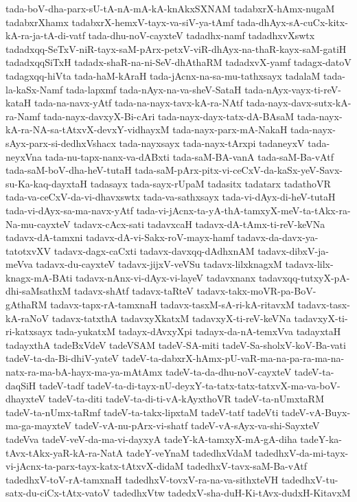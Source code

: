 {tada-boV-dha-parx-sU-tA-nA-mA-kA-knAkxSXNAM
tadabxrX-hAmx-nugaM
tadabxrXhamx
tadabxrX-hemxV-tayx-va-siV-ya-tAmf
tada-dhAyx-sA-cuCx-kitx-kA-ra-ja-tA-di-vatf
tada-dhu-noV-cayxteV
tadadhx-namf
tadadhxvXswtx
tadadxqq-SeTxV-niR-tayx-saM-pArx-petxV-viR-dhAyx-na-thaR-kayx-saM-gatiH
tadadxqqSiTxH
tadadx-shaR-na-ni-SeV-dhAthaRM
tadadxvX-yamf
tadagx-datoV
tadagxqq-hiVta
tada-haM-kAraH
tada-jAcnx-na-sa-mu-tathxsayx
tadalaM
tada-la-kaSx-Namf
tada-lapxmf
tada-nAyx-na-va-sheV-SataH
tada-nAyx-vayx-ti-reV-kataH
tada-na-navx-yAtf
tada-na-nayx-tavx-kA-ra-NAtf
tada-nayx-davx-sutx-kA-ra-Namf
tada-nayx-davxyX-Bi-cAri
tada-nayx-dayx-tatx-dA-BAsaM
tada-nayx-kA-ra-NA-sa-tAtxvX-devxY-vidhayxM
tada-nayx-parx-mA-NakaH
tada-nayx-sAyx-parx-si-dedhxVshacx
tada-nayxsayx
tada-nayx-tArxpi
tadaneyxV
tada-neyxVna
tada-nu-tapx-nanx-va-dABxti
tada-saM-BA-vanA
tada-saM-Ba-vAtf
tada-saM-boV-dha-heV-tutaH
tada-saM-pArx-pitx-vi-ceCxV-da-kaSx-yeV-Savx-su-Ka-kaq-dayxtaH
tadasayx
tada-sayx-rUpaM
tadasitx
tadatarx
tadathoVR
tada-va-ceCxV-da-vi-dhavxswtx
tada-va-sathxsayx
tada-vi-dAyx-di-heV-tutaH
tada-vi-dAyx-sa-ma-navx-yAtf
tada-vi-jAcnx-ta-yA-thA-tamxyX-meV-ta-tAkx-ra-Na-mu-cayxteV
tadavx-cAcx-sati
tadavxcaH
tadavx-dA-tAmx-ti-reV-keVNa
tadavx-dA-tamxni
tadavx-dA-vi-Sakx-roV-mayx-hamf
tadavx-da-davx-ya-tatotxvXV
tadavx-dagx-caCxti
tadavx-davxqq-dAdhxnAM
tadavx-dibxV-ja-meVva
tadavx-du-cayxteV
tadavx-jijxV-veVSu
tadavx-lilxknagxM
tadavx-lilx-knagx-mA-BAti
tadavx-nAnx-vi-dAyx-vi-layeV
tadavxnanx
tadavxqq-tutxyX-pA-dhi-saMsathxM
tadavx-shAtf
tadavx-taRteV
tadavx-takx-moVR-pa-BoV-gAthaRM
tadavx-tapx-rA-tamxnaH
tadavx-tasxM-sA-ri-kA-ritavxM
tadavx-tasx-kA-raNoV
tadavx-tatxthA
tadavxyXkatxM
tadavxyX-ti-reV-keVNa
tadavxyX-ti-ri-katxsayx
tada-yukatxM
tadayx-dAvxyXpi
tadayx-da-nA-temxVva
tadayxtaH
tadayxthA
tadeBxVdeV
tadeVSAM
tadeV-SA-miti
tadeV-Sa-sholxV-koV-Ba-vati
tadeV-ta-da-Bi-dhiV-yateV
tadeV-ta-dabxrX-hAmx-pU-vaR-ma-na-pa-ra-ma-na-natx-ra-ma-bA-hayx-ma-ya-mAtAmx
tadeV-ta-da-dhu-noV-cayxteV
tadeV-ta-daqSiH
tadeV-tadf
tadeV-ta-di-tayx-nU-deyxY-ta-tatx-tatx-tatxvX-ma-va-boV-dhayxteV
tadeV-ta-diti
tadeV-ta-di-ti-vA-kAyxthoVR
tadeV-ta-nUmxtaRM
tadeV-ta-nUmx-taRmf
tadeV-ta-takx-lipxtaM
tadeV-tatf
tadeVti
tadeV-vA-Buyx-ma-ga-mayxteV
tadeV-vA-nu-pArx-vi-shatf
tadeV-vA-sAyx-va-shi-SayxteV
tadeVva
tadeV-veV-da-ma-vi-dayxyA
tadeY-kA-tamxyX-mA-gA-diha
tadeY-ka-tAvx-tAkx-yaR-kA-ra-NatA
tadeY-veYnaM
tadedhxVdaM
tadedhxV-da-mi-tayx-vi-jAcnx-ta-parx-tayx-katx-tAtxvX-didaM
tadedhxV-tavx-saM-Ba-vAtf
tadedhxV-toV-rA-tamxnaH
tadedhxV-tovxV-ra-na-va-sithxteVH
tadedhxV-tu-satx-du-ciCx-tAtx-vatoV
tadedhxVtw
tadedxV-sha-duH-Ki-tAvx-dudxH-KitavxM
}
